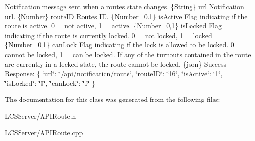 Notification message sent when a route\textquotesingle{}s state changes.  \{String\} url Notification url.  \{Number\} route\+ID Route\textquotesingle{}s ID.  \{Number=0,1\} is\+Active Flag indicating if the route is active. 0 = not active, 1 = active.  \{Number=0,1\} is\+Locked Flag indicating if the route is currently locked. 0 = not locked, 1 = locked  \{Number=0,1\} can\+Lock Flag indicating if the lock is allowed to be locked. 0 = cannot be locked, 1 = can be locked. If any of the turnouts contained in the route are currently in a locked state, the route cannot be locked.  \{json\} Success-\/\+Response\+: \{ \char`\"{}url\char`\"{}\+: \char`\"{}/api/notification/route\char`\"{}, \char`\"{}route\+I\+D\char`\"{}\+: \char`\"{}16\char`\"{}, \char`\"{}is\+Active\char`\"{}\+: \char`\"{}1\char`\"{}, \char`\"{}is\+Locked\char`\"{}\+: \char`\"{}0\char`\"{}, \char`\"{}can\+Lock\char`\"{}\+: \char`\"{}0\char`\"{} \} 

The documentation for this class was generated from the following files\+:\begin{DoxyCompactItemize}
\item 
L\+C\+S\+Server/A\+P\+I\+Route.\+h\item 
L\+C\+S\+Server/A\+P\+I\+Route.\+cpp\end{DoxyCompactItemize}
